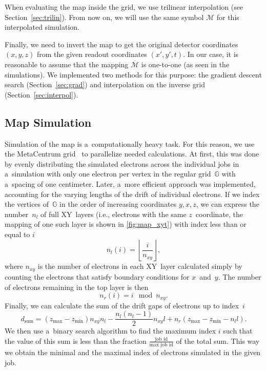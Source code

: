 		When evaluating the map inside the grid, we use trilinear interpolation (see Section~\ref{sec:trilin}). From now on, we will use the same symbol $\mathcal{M}$ for this interpolated simulation.
		
		Finally, we need to invert the map to get the original detector coordinates $(x,y,z)$ from the given readout coordinates $(x',y',t)$. In our case, it is reasonable to assume that the mapping $\overline{\mathcal{M}}$ is one-to-one (as seen in the simulations). We implemented two methods for this purpose: the gradient descent search (Section~\ref{sec:grad}) and interpolation on the inverse grid (Section~\ref{sec:interpol}).
		
		\subsection{Map Simulation}
			Simulation of the map is a~computationally heavy task. For this reason, we use the MetaCentrum grid~\cite{metacentrum} to parallelize needed calculations. At first, this was done by evenly distributing the simulated electrons across the individual jobs in a~simulation with only one electron per vertex in the regular grid~$\mathbb{G}$ with a~spacing of one centimeter. Later, a~more efficient approach was implemented, accounting for the varying lengths of the drift of individual electrons. If we index the vertices of~$\mathbb{G}$ in the order of increasing coordinates $y,x,z$, we can express the number~$n_l$ of full XY~layers (i.e., electrons with the same $z$~coordinate, the mapping of one such layer is shown in \cref{fig:map_xyt}) with index less than or equal to $i$
				\begin{equation}
					n_l(i) = \left\lfloor\frac{i}{n_{xy}}\right\rfloor,
				\end{equation}
			where $n_{xy}$ is the number of electrons in each XY~layer calculated simply by counting the electrons that satisfy boundary conditions for $x$~and~$y$. The number of electrons remaining in the top layer is then
				\begin{equation}
					n_r(i) = i\!\!\!\!\mod n_{xy}.
				\end{equation}
			Finally, we can calculate the sum of the drift gaps of electrons up to index~$i$
				\begin{equation}
					d_\text{sum} = (z_\text{max}-z_\text{min})n_{xy}n_l-\frac{n_l(n_l-1)}{2}n_{xy}l+n_r(z_\text{max}-z_\text{min}-n_l l).
				\end{equation}
			We then use a~binary search algorithm to find the maximum index $i$ such that the value of this sum is less than the fraction $\frac{\text{job id}}{\text{max job id}}$ of the total sum. This way we obtain the minimal and the maximal index of electrons simulated in the given job.
			
